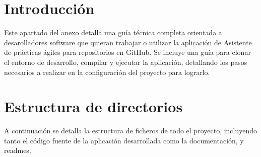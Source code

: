
\section{Introducción}

Este apartado del anexo detalla una guía técnica completa orientada a desarolladores software que quieran trabajar o utilizar la aplicación de Asistente de prácticas ágiles para repositorios en GitHub. Se incluye una guía para clonar el entorno de desarrollo, compilar y ejecutar la aplicación, detallando los pasos necesarios a realizar en la configuración del proyecto para lograrlo.

\section{Estructura de directorios}
A continuación se detalla la estructura de ficheros de todo el proyecto, incluyendo tanto el código fuente de la aplicación desarrollada como la documentación, y readmes.
